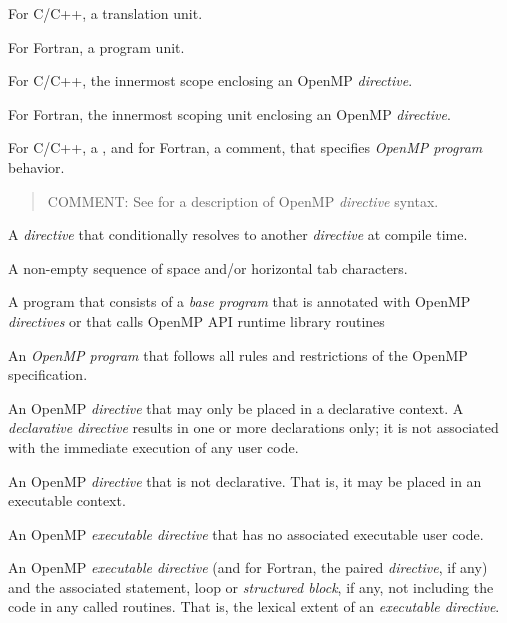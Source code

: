 \glossarydefstart
For C/C++, a translation unit.

For Fortran, a program unit.
\glossarydefend

\glossarydefstart
For C/C++, the innermost scope enclosing an OpenMP \emph{directive}.

For Fortran, the innermost scoping unit enclosing an OpenMP \emph{directive}.
\glossarydefend

\glossarydefstart
For C/C++, a , and for Fortran, a comment, that specifies \emph{OpenMP
program} behavior.

\begin{quote}
COMMENT: See  for a description of OpenMP \emph{directive} syntax.
\end{quote}
\glossarydefend

\glossarydefstart
A \emph{directive} that conditionally resolves to another \emph{directive} at compile time.
\glossarydefend


\glossarydefstart
A non-empty sequence of space and/or horizontal tab characters.
\glossarydefend

\glossarydefstart
A program that consists of a \emph{base program} that is annotated with OpenMP
\emph{directives} or that calls OpenMP API runtime library routines
\glossarydefend

\glossarydefstart
An \emph{OpenMP program} that follows all rules and restrictions of the OpenMP
specification.
\glossarydefend

\glossarydefstart
An OpenMP \emph{directive} that may only be placed in a declarative context. A
\emph{declarative directive} results in one or more declarations only; it is not associated
with the immediate execution of any user code.
\glossarydefend

\glossarydefstart
An OpenMP \emph{directive} that is not declarative. That is, it may be placed in an
executable context.
\glossarydefend

\glossarydefstart
An OpenMP \emph{executable directive} that has no associated executable user code.
\glossarydefend


\glossarydefstart
An OpenMP \emph{executable directive} (and for Fortran, the paired  \emph{directive}, if
any) and the associated statement, loop or \emph{structured block}, if any, not including
the code in any called routines. That is, the lexical extent of an \emph{executable
directive}.
\glossarydefend

